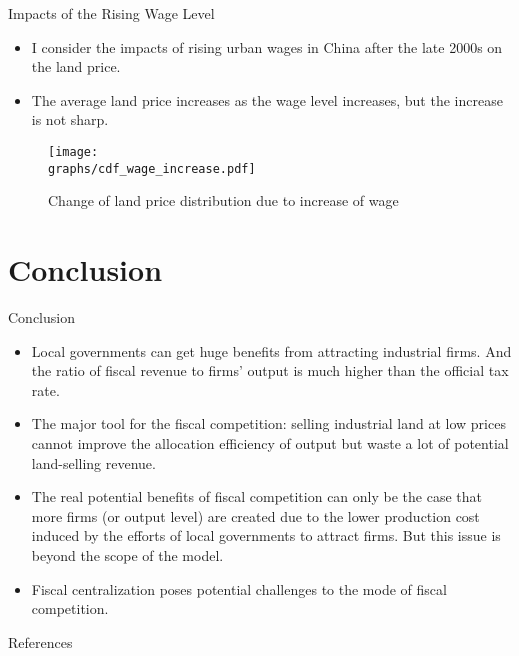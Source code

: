 \documentclass[xcolor={dvipsnames}]{beamer}
\theoremstyle{plain}
\newcommand{\graphs}{../../Graphs}
\begin{document}
\begin{frame}{Impacts of the Rising Wage Level}
    \begin{itemize}
        \item  I consider the impacts of rising urban wages in China after the late 2000s
              on the land price.
        \item The average land price
              increases as the wage level increases, but the increase is not sharp.
    \end{itemize}
    \begin{figure}[H]
        \centering
        \caption*{Change of land price distribution due to increase of wage}
        \texttt{[image: \\graphs/cdf\_wage\_increase.pdf]}
    \end{figure}

\end{frame}

\section{Conclusion}
\begin{frame}{Conclusion}
    \normalsize
    \begin{itemize}
        \item Local governments can get huge benefits from attracting industrial firms.
              And the ratio of fiscal revenue to firms' output is much higher than the official tax rate.
        \item The major tool for the fiscal competition:
              selling industrial land at low prices cannot improve the allocation efficiency of output
              but waste a lot of potential land-selling revenue.
        \item The real potential benefits of fiscal competition can only be the case that more
              firms (or output level) are created due to the lower production cost
              induced by the efforts of local governments to attract firms. But this
              issue is beyond the scope of the model.
        \item Fiscal centralization poses potential challenges to the mode of fiscal competition.
    \end{itemize}
\end{frame}

\begin{frame}[allowframebreaks]{References}
    
\end{frame}
\end{document}
